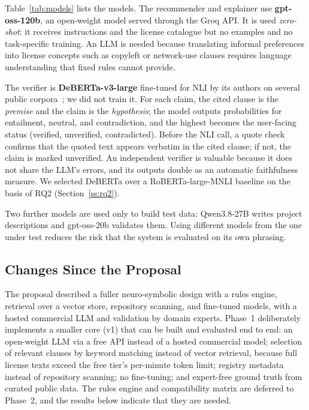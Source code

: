 Table~\ref{tab:models} lists the models. The recommender and explainer use \textbf{gpt-oss-120b}, an open-weight model served through the Groq API. It is used \emph{zero-shot}: it receives instructions and the license catalogue but no examples and no task-specific training. An LLM is needed because translating informal preferences into license concepts such as copyleft or network-use clauses requires language understanding that fixed rules cannot provide.

The verifier is \textbf{DeBERTa-v3-large} fine-tuned for NLI by its authors on several public corpora~\cite{laurer2024less}; we did not train it. For each claim, the cited clause is the \emph{premise} and the claim is the \emph{hypothesis}; the model outputs probabilities for entailment, neutral, and contradiction, and the highest becomes the user-facing status (verified, unverified, contradicted). Before the NLI call, a quote check confirms that the quoted text appears verbatim in the cited clause; if not, the claim is marked unverified. An independent verifier is valuable because it does not share the LLM's errors, and its outputs double as an automatic faithfulness measure. We selected DeBERTa over a RoBERTa-large-MNLI baseline on the basis of RQ2 (Section~\ref{ss:rq2}).

Two further models are used only to build test data: Qwen3.8-27B writes project descriptions and gpt-oss-20b validates them. Using different models from the one under test reduces the risk that the system is evaluated on its own phrasing.

\subsection{Changes Since the Proposal}
\label{ss:changes}

The proposal described a fuller neuro-symbolic design with a rules engine, retrieval over a vector store, repository scanning, and fine-tuned models, with a hosted commercial LLM and validation by domain experts. Phase~1 deliberately implements a smaller core (v1) that can be built and evaluated end to end: an open-weight LLM via a free API instead of a hosted commercial model; selection of relevant clauses by keyword matching instead of vector retrieval, because full license texts exceed the free tier's per-minute token limit; registry metadata instead of repository scanning; no fine-tuning; and expert-free ground truth from curated public data. The rules engine and compatibility matrix are deferred to Phase~2, and the results below indicate that they are needed.

